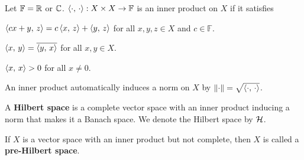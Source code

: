 \begin{definition}
    Let $\mathbb{F} = \mathbb{R}$ or $\mathbb{C}$. $\left\langle {\cdot},\, {\cdot} \right\rangle:X\times X\to\mathbb{F}$ 
    is an inner product on $X$ if it satisfies 
    \begin{thmenum}
        \item $\left\langle {cx+y},\, {z} \right\rangle = c\left\langle {x},\, {z} \right\rangle + \left\langle {y},\, {z} \right\rangle$ for all 
        $x,y,z\in X$ and $c\in\mathbb{F}$. 
        \item $\left\langle {x},\, {y} \right\rangle = \overline{\left\langle {y},\, {x} \right\rangle}$ for all $x,y\in X$. 
        \item $\left\langle {x},\, {x} \right\rangle> 0$ for all $x\neq 0$.
    \end{thmenum}
\end{definition}
\begin{remark}
    An inner product automatically induces a norm on $X$ by $\left\lVert {\cdot} \right\rVert 
    = \sqrt{\left\langle {\cdot},\, {\cdot} \right\rangle}$.
\end{remark}

\begin{definition}
    A \textbf{Hilbert space} is a complete vector space with an inner product 
    inducing a norm that makes it a Banach space. We denote the Hilbert space 
    by $\mathcal{H}$.
\end{definition} 
\begin{remark}
    If $X$ is a vector space with an inner product but not complete, then 
    $X$ is called a \textbf{pre-Hilbert space}.
\end{remark}

